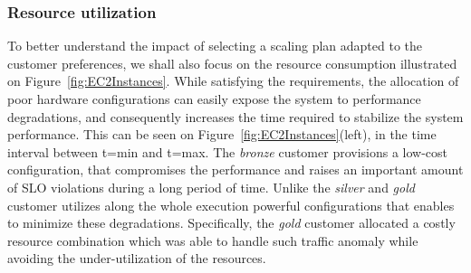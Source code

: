 \subsubsection{Resource utilization} 
To better understand the impact of selecting a scaling plan adapted to the customer preferences, we shall also focus on the resource consumption illustrated on Figure~\ref{fig:EC2Instances}. While satisfying the requirements, the allocation of poor hardware configurations can easily expose the system to performance degradations, and consequently increases the time required to stabilize the system performance. This can be seen on  Figure~\ref{fig:EC2Instances}(left), in the time interval between t=min and t=max. The \emph{bronze} customer provisions a low-cost configuration, that compromises the performance and raises an important amount of SLO violations during a long period of time. Unlike the \emph{silver} and \emph{gold} customer utilizes along the whole execution powerful configurations that enables to minimize these degradations. Specifically, the \emph{gold} customer allocated a costly resource combination which was able to handle such traffic anomaly while avoiding the under-utilization of the resources. 


